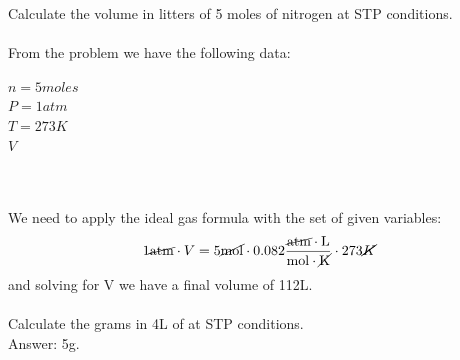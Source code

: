 \documentclass[main.tex]{subfiles}
\begin{document}
\begin{description}
\begin{equation*}
\end{equation*}
\begin{example} %
Calculate the volume in litters of 5 moles of nitrogen at STP conditions.
\\
\\
From the problem we have the following data:
\begin{tcbitemize}[raster columns=3, raster rows=3, enhanced, sharp corners, raster equal height=rows, raster force size=false, raster column skip=0pt, raster row skip = 0pt]
\tcbitem[blankest, width=1cm]
\tcbitem[header = helpful]
\texta
\tcbitem[header = harmful]
\textb
\tcbitem[firstcol = internal]
\textcn
\tcbitem[swotbox = G]
$n=5 moles$\\
$P=1atm$\\
$T=273K$\\
\tcbitem[swotbox = A]
$V$\\
\\
\\
\end{tcbitemize}%
We need to apply the ideal gas formula with the set of given variables:
\begin{equation*}
1 \cancel{\text{atm}}\cdot V=5\cancel{\text{mol}}\cdot 0.082\frac{\cancel{\text{atm}}\cdot \text{L}}{\text{mol}\cdot \cancel{\text{K}}}\cdot 273\cancel{K}
\end{equation*}
and solving for V we have a final volume of 112L.
\\
\faDiamond\ \\
Calculate the grams in 4L of  at STP conditions.
\\
\flushright Answer: 5g.
\end{example}%

\end{description}
\end{document}
